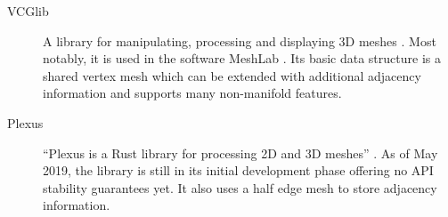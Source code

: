 \begin{description}
  \item [VCGlib] A \cpp library for manipulating, processing and displaying 3D meshes \cite{vcglibhomepage}.
  Most notably, it is used in the software MeshLab \cite{meshlabhomepage}.
  Its basic data structure is a shared vertex mesh which can be extended with additional adjacency information and supports many non-manifold features.

  \item [Plexus] \enquote{Plexus is a Rust library for processing 2D and 3D meshes} \cite{plexus}.
  As of May 2019, the library is still in its initial development phase offering no API stability guarantees yet.
  It also uses a half edge mesh to store adjacency information.
\end{description}


\setlength{\tabcolsep}{\origtabcolsep}
